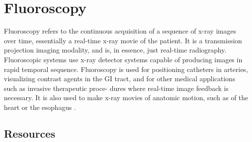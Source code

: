 \chapter{Fluoroscopy}

Fluoroscopy refers to the continuous acquisition of a sequence of x-ray images over
time, essentially a real-time x-ray movie of the patient. It is a transmission projection
imaging modality, and is, in essence, just real-time radiography. Fluoroscopic systems
use x-ray detector systems capable of producing images in rapid temporal sequence.
Fluoroscopy is used for positioning catheters in arteries, visualizing contrast agents
in the GI tract, and for other medical applications such as invasive therapeutic proce-
dures where real-time image feedback is necessary. It is also used to make x-ray movies
of anatomic motion, such as of the heart or the esophagus \cite{bushberg2011essential}.

\section{Resources}


